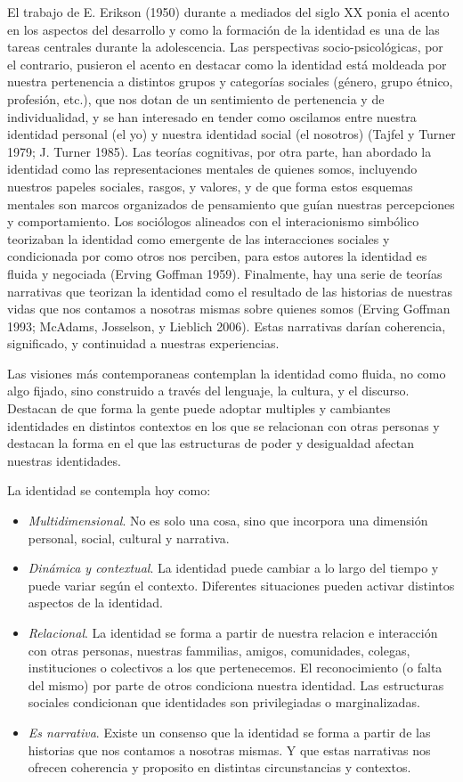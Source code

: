 \documentclass[
  spanish,
  letterpaper,
  DIV=11,
  numbers=noendperiod]{scrreprt}
\begin{document}
El trabajo de E. Erikson (1950) durante a mediados del siglo XX ponia el
acento en los aspectos del desarrollo y como la formación de la
identidad es una de las tareas centrales durante la adolescencia. Las
perspectivas socio-psicológicas, por el contrario, pusieron el acento en
destacar como la identidad está moldeada por nuestra pertenencia a
distintos grupos y categorías sociales (género, grupo étnico, profesión,
etc.), que nos dotan de un sentimiento de pertenencia y de
individualidad, y se han interesado en tender como oscilamos entre
nuestra identidad personal (el yo) y nuestra identidad social (el
nosotros) (Tajfel y Turner 1979; J. Turner 1985). Las teorías
cognitivas, por otra parte, han abordado la identidad como las
representaciones mentales de quienes somos, incluyendo nuestros papeles
sociales, rasgos, y valores, y de que forma estos esquemas mentales son
marcos organizados de pensamiento que guían nuestras percepciones y
comportamiento. Los sociólogos alineados con el interacionismo simbólico
teorizaban la identidad como emergente de las interacciones sociales y
condicionada por como otros nos perciben, para estos autores la
identidad es fluida y negociada (Erving Goffman 1959). Finalmente, hay
una serie de teorías narrativas que teorizan la identidad como el
resultado de las historias de nuestras vidas que nos contamos a nosotras
mismas sobre quienes somos (Erving Goffman 1993; McAdams, Josselson, y
Lieblich 2006). Estas narrativas darían coherencia, significado, y
continuidad a nuestras experiencias.

Las visiones más contemporaneas contemplan la identidad como fluida, no
como algo fijado, sino construido a través del lenguaje, la cultura, y
el discurso. Destacan de que forma la gente puede adoptar multiples y
cambiantes identidades en distintos contextos en los que se relacionan
con otras personas y destacan la forma en el que las estructuras de
poder y desigualdad afectan nuestras identidades.

La identidad se contempla hoy como:

\begin{itemize}
\item
  \emph{Multidimensional}. No es solo una cosa, sino que incorpora una
  dimensión personal, social, cultural y narrativa.
\item
  \emph{Dinámica y contextual}. La identidad puede cambiar a lo largo
  del tiempo y puede variar según el contexto. Diferentes situaciones
  pueden activar distintos aspectos de la identidad.
\item
  \emph{Relacional}. La identidad se forma a partir de nuestra relacion
  e interacción con otras personas, nuestras fammilias, amigos,
  comunidades, colegas, instituciones o colectivos a los que
  pertenecemos. El reconocimiento (o falta del mismo) por parte de otros
  condiciona nuestra identidad. Las estructuras sociales condicionan que
  identidades son privilegiadas o marginalizadas.
\item
  \emph{Es narrativa}. Existe un consenso que la identidad se forma a
  partir de las historias que nos contamos a nosotras mismas. Y que
  estas narrativas nos ofrecen coherencia y proposito en distintas
  circunstancias y contextos.
\end{itemize}
\end{document}

